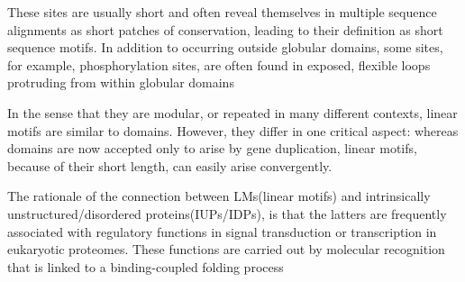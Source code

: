 These sites are usually short and often reveal themselves in multiple sequence alignments as short patches of conservation, leading to their definition as short sequence motifs. 
In addition to occurring outside globular domains, some sites, for example, phosphorylation sites, are often found in exposed, flexible loops protruding from within globular domains

In the sense that they are modular, or repeated in many different contexts, linear motifs are similar to domains. 
However, they differ in one critical aspect: whereas domains are now accepted only to arise by gene duplication, linear motifs, because of their short length, can easily arise convergently.

The rationale of the connection between LMs(linear motifs) and intrinsically unstructured/disordered proteins(IUPs/IDPs), is that the latters are frequently associated with
regulatory functions in signal transduction or transcription in eukaryotic proteomes. These functions are carried out by molecular recognition that is linked to a binding-coupled
folding process












